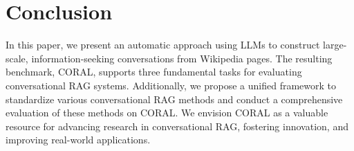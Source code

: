 \documentclass[11pt]{article}
\begin{document}


\section{Conclusion}
In this paper, we present an automatic approach using LLMs to construct large-scale, information-seeking conversations from Wikipedia pages. The resulting benchmark, CORAL, supports three fundamental tasks for evaluating conversational RAG systems. Additionally, we propose a unified framework to standardize various conversational RAG methods and conduct a comprehensive evaluation of these methods on CORAL. We envision CORAL as a valuable resource for advancing research in conversational RAG, fostering innovation, and improving real-world applications. 



\end{document}
